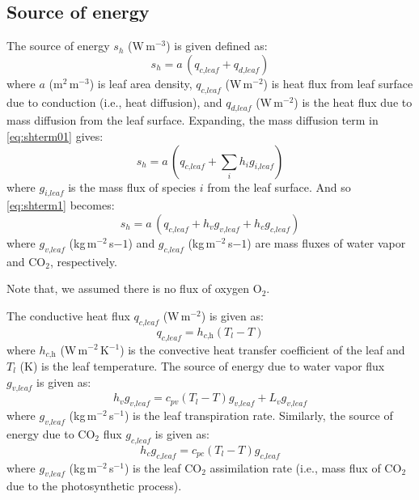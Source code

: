 \subsection{Source of energy}

The source of energy $s_h$ (W\,m$^{-3}$) is given defined as:
\begin{equation}
s_h = a\,\left(q_{\textit{c,leaf}} + q_{\textit{d,leaf}}\right)
\label{eq:shterm01}
\end{equation}
where $a$ (m$^{2}$\,m$^{-3}$) is leaf area density, $q_{\textit{c,leaf}}$ (W\,m$^{-2}$) is heat flux from leaf surface due to conduction (i.e., heat diffusion), and $q_{\textit{d,leaf}}$ (W\,m$^{-2}$) is the heat flux due to mass diffusion from the leaf surface. Expanding, the mass diffusion term in \cref{eq:shterm01} gives:
\begin{equation}
s_h = a\,\left(q_{\textit{c,leaf}} + \sum_i h_i g_{\textit{i,leaf}} \right)
\label{eq:shterm1}
\end{equation}
where $ g_{\textit{i,leaf}} $ is the mass flux of species $i$ from the leaf surface. And so \cref{eq:shterm1} becomes: 
\begin{equation}
s_h = a\, \left(q_{\textit{c,leaf}} + h_v g_{\textit{v,leaf}} + h_c g_{\textit{c,leaf}} \right)
\label{eq:shterm2}
\end{equation}
where $g_{\textit{v,leaf}}$ (kg\,m$^{-2}$\,s${-1}$) and $g_{\textit{c,leaf}}$ (kg\,m$^{-2}$\,s${-1}$) are mass fluxes of water vapor and CO$_2$, respectively.

\begin{assumption}
Note that, we assumed there is no flux of oxygen O$_2$.
\end{assumption}

The conductive heat flux $q_{\textit{c,leaf}}$ (W\,m$^{-2}$) is given as:
\begin{equation}
q_{\textit{c,leaf}} = h_{\textit{c,h}} \left(T_l - T\right)
\label{eq:qcleaf}
\end{equation}
where $h_{\textit{c,h}}$ (W\,m$^{-2}$\,K$^{-1}$) is the convective heat transfer coefficient of the leaf and $T_l$ (K) is the leaf temperature. The source of energy due to water vapor flux $g_{\textit{v,leaf}}$ is given as:
\begin{equation}
h_v g_{\textit{v,leaf}} = c_{\textit{pv}} \left(T_l - T\right) g_{\textit{v,leaf}} + L_v g_{\textit{v,leaf}}
\end{equation}
where $g_{\textit{v,leaf}}$ (kg\,m$^{-2}$\,s$^{-1}$) is the leaf transpiration rate. Similarly, the source of energy due to CO$_2$ flux $g_{\textit{c,leaf}}$ is given as:
\begin{equation}
h_c g_{\textit{c,leaf}} = c_{\textit{pc}} \left(T_l - T\right) g_{\textit{c,leaf}}
\label{eq:qdvleaf}
\end{equation}
where $g_{\textit{v,leaf}}$ (kg\,m$^{-2}$\,s$^{-1}$) is the leaf CO$_2$ assimilation rate (i.e., mass flux of CO$_2$ due to the photosynthetic process). 

